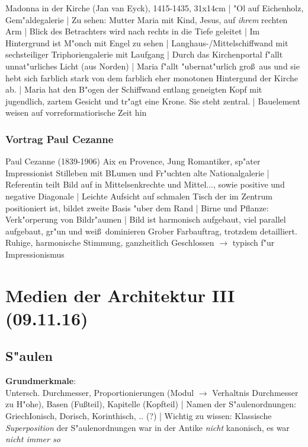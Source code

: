 \documentclass[]{scrartcl}
\begin{document}
Madonna in der Kirche (Jan van Eyck), 1415-1435, 31x14cm | 
"Ol auf Eichenholz, Gem"aldegalerie |
Zu sehen: Mutter Maria mit Kind, Jesus, auf \emph{ihrem} rechten Arm |
Blick des Betrachters wird nach rechts in die Tiefe geleitet |
Im Hintergrund ist M"onch mit Engel zu sehen |
Langhaus-/Mittelschiffwand mit sechsteiliger Triphoriengalerie mit Laufgang |
Durch das Kirchenportal f"allt unnat"urliches Licht (aus Norden) |
Maria f"allt "ubernat"urlich gro\ss~aus und sie hebt sich farblich stark von dem farblich eher monotonen Hintergund der Kirche ab. | 
Maria hat den B"ogen der Schiffwand entlang geneigten Kopf mit jugendlich, zartem Gesicht und tr"agt eine Krone. Sie steht zentral. | Bauelement weisen auf vorreformatiorische Zeit hin

\subsubsection{Vortrag Paul Cezanne}

Paul Cezanne (1839-1906) Aix en Provence, Jung Romantiker, sp"ater Impressionist
Stilleben mit BLumen und Fr"uchten alte Nationalgalerie |
Referentin teilt Bild auf in Mittelsenkrechte und Mittel..., sowie positive und negative Diagonale |
Leichte Aufsicht auf schmalen Tisch der im Zentrum positioniert ist, bildet zweite Basis "uber dem Rand | 
Birne und Pflanze: Verk"orperung von Bildr"aumen | 
Bild ist harmonisch aufgebaut, viel parallel aufgebaut, gr"un und wei\ss~dominieren
Grober Farbauftrag, trotzdem detailliert. Ruhige, harmonische Stimmung, ganzheitlich Geschlossen $\rightarrow$ typisch f"ur Impressionismus



\section{Medien der Architektur III \\(09.11.16)}

\subsection{S"aulen}

\textbf{Grundmerkmale}:\\Untersch. Durchmesser, Proportionierungen (Modul $\rightarrow$ Verhaltnis Durchmesser zu H"ohe), Basen (Fu\ss teil), Kapitelle (Kopfteil) | Namen der S"aulenordnungen: GriechIonisch, Dorisch, Korinthisch, .. {\color{red}(?)} | Wichtig zu wissen: Klassische \emph{Superposition} der S"aulenordnungen war in der Antike \emph{nicht} kanonisch, es war \emph{nicht immer so}
\end{document}
